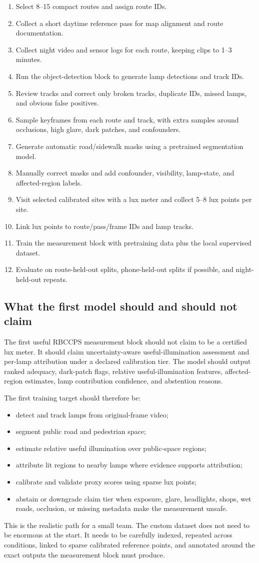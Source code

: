 \documentclass[11pt]{article}
\begin{document}
\begin{enumerate}
  \item Select 8--15 compact routes and assign route IDs.
  \item Collect a short daytime reference pass for map alignment and route documentation.
  \item Collect night video and sensor logs for each route, keeping clips to 1--3 minutes.
  \item Run the object-detection block to generate lamp detections and track IDs.
  \item Review tracks and correct only broken tracks, duplicate IDs, missed lamps, and obvious false positives.
  \item Sample keyframes from each route and track, with extra samples around occlusions, high glare, dark patches, and confounders.
  \item Generate automatic road/sidewalk masks using a pretrained segmentation model.
  \item Manually correct masks and add confounder, visibility, lamp-state, and affected-region labels.
  \item Visit selected calibrated sites with a lux meter and collect 5--8 lux points per site.
  \item Link lux points to route/pass/frame IDs and lamp tracks.
  \item Train the measurement block with pretraining data plus the local supervised dataset.
  \item Evaluate on route-held-out splits, phone-held-out splits if possible, and night-held-out repeats.
\end{enumerate}

\subsection{What the first model should and should not claim}

The first useful RBCCPS measurement block should not claim to be a certified lux meter. It should claim uncertainty-aware useful-illumination assessment and per-lamp attribution under a declared calibration tier. The model should output ranked adequacy, dark-patch flags, relative useful-illumination features, affected-region estimates, lamp contribution confidence, and abstention reasons.

The first training target should therefore be:
\begin{itemize}
  \item detect and track lamps from original-frame video;
  \item segment public road and pedestrian space;
  \item estimate relative useful illumination over public-space regions;
  \item attribute lit regions to nearby lamps where evidence supports attribution;
  \item calibrate and validate proxy scores using sparse lux points;
  \item abstain or downgrade claim tier when exposure, glare, headlights, shops, wet roads, occlusion, or missing metadata make the measurement unsafe.
\end{itemize}

This is the realistic path for a small team. The custom dataset does not need to be enormous at the start. It needs to be carefully indexed, repeated across conditions, linked to sparse calibrated reference points, and annotated around the exact outputs the measurement block must produce.
\end{document}
